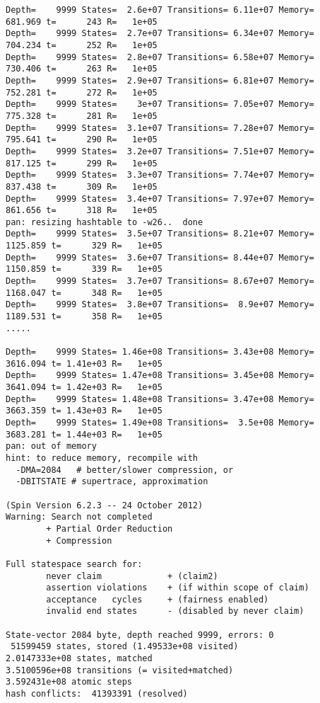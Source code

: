 \documentclass{llncs}
\begin{document}
\begin{lstlisting}[frame=single]
Depth=    9999 States=  2.6e+07 Transitions= 6.11e+07 Memory=   681.969 t=      243 R=   1e+05
Depth=    9999 States=  2.7e+07 Transitions= 6.34e+07 Memory=   704.234 t=      252 R=   1e+05
Depth=    9999 States=  2.8e+07 Transitions= 6.58e+07 Memory=   730.406 t=      263 R=   1e+05
Depth=    9999 States=  2.9e+07 Transitions= 6.81e+07 Memory=   752.281 t=      272 R=   1e+05
Depth=    9999 States=    3e+07 Transitions= 7.05e+07 Memory=   775.328 t=      281 R=   1e+05
Depth=    9999 States=  3.1e+07 Transitions= 7.28e+07 Memory=   795.641 t=      290 R=   1e+05
Depth=    9999 States=  3.2e+07 Transitions= 7.51e+07 Memory=   817.125 t=      299 R=   1e+05
Depth=    9999 States=  3.3e+07 Transitions= 7.74e+07 Memory=   837.438 t=      309 R=   1e+05
Depth=    9999 States=  3.4e+07 Transitions= 7.97e+07 Memory=   861.656 t=      318 R=   1e+05
pan: resizing hashtable to -w26..  done
Depth=    9999 States=  3.5e+07 Transitions= 8.21e+07 Memory=  1125.859 t=      329 R=   1e+05
Depth=    9999 States=  3.6e+07 Transitions= 8.44e+07 Memory=  1150.859 t=      339 R=   1e+05
Depth=    9999 States=  3.7e+07 Transitions= 8.67e+07 Memory=  1168.047 t=      348 R=   1e+05
Depth=    9999 States=  3.8e+07 Transitions=  8.9e+07 Memory=  1189.531 t=      358 R=   1e+05
.....

Depth=    9999 States= 1.46e+08 Transitions= 3.43e+08 Memory=  3616.094 t= 1.41e+03 R=   1e+05
Depth=    9999 States= 1.47e+08 Transitions= 3.45e+08 Memory=  3641.094 t= 1.42e+03 R=   1e+05
Depth=    9999 States= 1.48e+08 Transitions= 3.47e+08 Memory=  3663.359 t= 1.43e+03 R=   1e+05
Depth=    9999 States= 1.49e+08 Transitions=  3.5e+08 Memory=  3683.281 t= 1.44e+03 R=   1e+05
pan: out of memory
hint: to reduce memory, recompile with
  -DMA=2084   # better/slower compression, or
  -DBITSTATE # supertrace, approximation

(Spin Version 6.2.3 -- 24 October 2012)
Warning: Search not completed
        + Partial Order Reduction
        + Compression

Full statespace search for:
        never claim             + (claim2)
        assertion violations    + (if within scope of claim)
        acceptance   cycles     + (fairness enabled)
        invalid end states      - (disabled by never claim)

State-vector 2084 byte, depth reached 9999, errors: 0
 51599459 states, stored (1.49533e+08 visited)
2.0147333e+08 states, matched
3.5100596e+08 transitions (= visited+matched)
3.592431e+08 atomic steps
hash conflicts:  41393391 (resolved)


\end{lstlisting}
\end{document}
